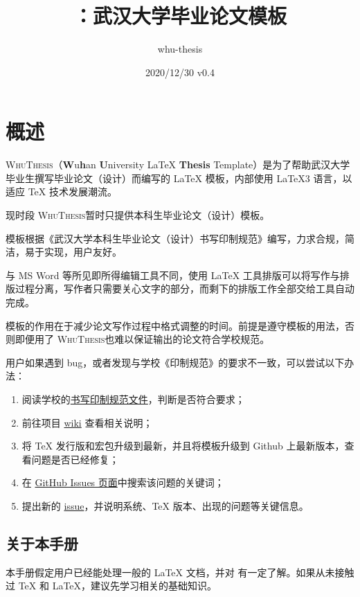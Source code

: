 \documentclass{fdudoc}
\title{\bfseries\WhuThesis：武汉大学毕业论文模板}
\author{whu-thesis}
\date{2020/12/30 \quad v0.4}
\newcommand\WhuThesis{\textsc{Whu\-The\-sis}}
\begin{document}
\maketitle
\tableofcontents

\section{概述}
\WhuThesis（\textbf{W}u\textbf{h}an \textbf{U}niversity \LaTeX{} \textbf{Thesis} Template）是为了帮助武汉大学毕业生撰写毕业论文（设计）而编写的 \LaTeX{} 模板，内部使用 \LaTeX3 语言，以适应 \TeX{} 技术发展潮流。

现时段 \WhuThesis 暂时只提供本科生毕业论文（设计）模板。

模板根据《武汉大学本科生毕业论文（设计）书写印制规范》编写，力求合规，简洁，易于实现，用户友好。

与 MS Word 等所见即所得编辑工具不同，使用 \LaTeX{} 工具排版可以将写作与排版过程分离，写作者只需要关心文字的部分，而剩下的排版工作全部交给工具自动完成。

模板的作用在于减少论文写作过程中格式调整的时间。前提是遵守模板的用法，否则即便用了 \WhuThesis 也难以保证输出的论文符合学校规范。

用户如果遇到 bug，或者发现与学校《印制规范》的要求不一致，可以尝试以下办法：
\begin{enumerate}
    \item 阅读学校的\href{https://github.com/mtobeiyf/whu-thesis/files/4638713/default.pdf}{书写印制规范文件}，判断是否符合要求；
    \item 前往项目 \href{https://github.com/mtobeiyf/whu-thesis/wiki}{wiki} 查看相关说明；
    \item 将 \TeX{} 发行版和宏包升级到最新，并且将模板升级到 Github 上最新版本，查看问题是否已经修复；
    \item 在 \href{https://github.com/mtobeiyf/whu-thesis/issues}{GitHub Issues 页面}中搜索该问题的关键词；
    \item 提出新的 \href{https://github.com/mtobeiyf/whu-thesis/issues}{issue}，并说明系统、\TeX{} 版本、出现的问题等关键信息。
\end{enumerate}

\subsection*{关于本手册}
本手册假定用户已经能处理一般的 \LaTeX{} 文档，并对  有一定了解。如果从未接触过 \TeX{} 和 \LaTeX{}，建议先学习相关的基础知识。
\end{document}
